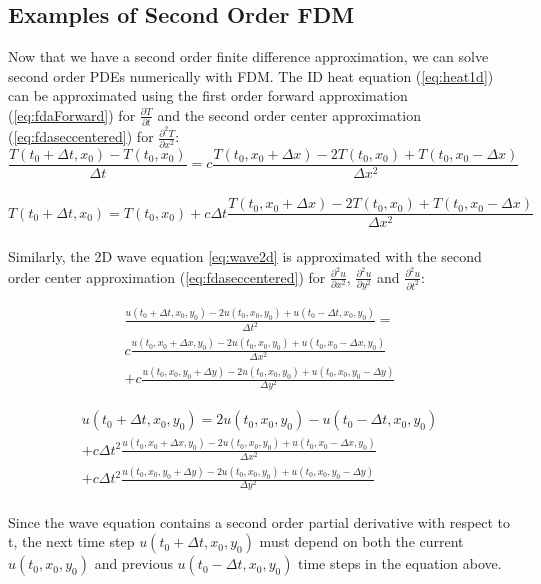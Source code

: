 {\subsection{Examples of Second Order FDM}

Now that we have a second order finite difference approximation, we can solve second order PDEs numerically with FDM.  The ID heat equation (\ref{eq:heat1d}) can be approximated using the first order forward approximation (\ref{eq:fdaForward}) for $\frac{\partial T}{\partial t}$ and the second order center approximation (\ref{eq:fdaseccentered}) for $\frac{\partial^{2} T}{\partial x^{2}}$:\\

 \begin{equation}
  \frac{T(t_{0} + \Delta  t, x_{0}) - T(t_{0}, x_{0})}{\Delta  t} = c\frac{T(t_{0},x_{0} + \Delta  x)- 2T(t_{0},x_{0}) + T(t_{0},x_{0} -\Delta  x)}{\Delta  x^{2}}
  \end{equation}
\\
 \begin{equation}\label{eq:heatfda1D}
  T(t_{0} + \Delta  t, x_{0}) = T(t_{0}, x_{0}) + c\Delta  t\frac{T(t_{0},x_{0} + \Delta  x) - 2T(t_{0},x_{0}) + T(t_{0},x_{0} -\Delta  x)}{\Delta  x^{2}}
  \end{equation}
\\
Similarly, the 2D wave equation \ref{eq:wave2d} is approximated with the second order center approximation (\ref{eq:fdaseccentered}) for $\frac{\partial^{2} u}{\partial x^{2}}$, $\frac{\partial^{2} u}{\partial y^{2}}$ and $\frac{\partial^{2} u}{\partial t^{2}}$:

 \begin{multline}
\frac{u(t_{0} + \Delta  t,x_{0},y_{0})- 2u(t_{0},x_{0},y_{0}) + u(t_{0} -\Delta  t,x_{0},y_{0})}{\Delta  t^{2}} = \\
c\frac{u(t_{0},x_{0} + \Delta  x,y_{0})- 2u(t_{0},x_{0},y_{0}) + u(t_{0},x_{0} -\Delta  x,y_{0})}{\Delta  x^{2}}\\
+c\frac{u(t_{0},x_{0},y_{0}+ \Delta  y)- 2u(t_{0},x_{0},y_{0}) + u(t_{0},x_{0},y_{0} -\Delta  y)}{\Delta  y^{2}}
  \end{multline}
  
   \begin{multline}\label{eq:wavefda2d}
u(t_{0} + \Delta  t,x_{0},y_{0})  = 2u(t_{0},x_{0},y_{0})-u(t_{0} -\Delta  t,x_{0},y_{0})\\
+c\Delta  t^{2}\frac{u(t_{0},x_{0} + \Delta  x,y_{0})- 2u(t_{0},x_{0},y_{0}) + u(t_{0},x_{0} -\Delta  x,y_{0})}{\Delta  x^{2}}\\
+c\Delta  t^{2}\frac{u(t_{0},x_{0},y_{0}+ \Delta  y)- 2u(t_{0},x_{0},y_{0}) + u(t_{0},x_{0},y_{0} -\Delta  y)}{\Delta  y^{2}}
  \end{multline}
\\
Since the wave equation contains a second order partial derivative with respect to t, the next time step $u(t_{0} + \Delta  t,x_{0},y_{0})$ must depend on both the current $u(t_{0},x_{0},y_{0})$ and previous $u(t_{0}-\Delta t,x_{0},y_{0})$ time steps in the equation above.

}
